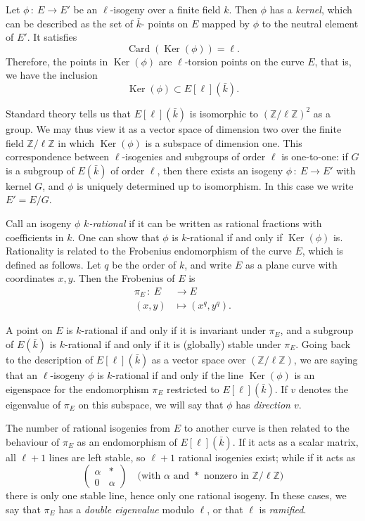 \documentclass{article}
\newcommand{\Z}{\mathbb{Z}}
\newcommand{\from}{\ensuremath{\,:\ }}
\DeclareMathOperator{\Ker}{Ker}
\DeclareMathOperator{\Card}{Card}
\begin{document}
Let $\phi\from E\to E'$ be an $\ell$-isogeny over a finite field $k$. Then 
$\phi$ has a \emph{kernel}, which can be described as the set of $\bar{k}$-
points on $E$ mapped by $\phi$ to the neutral element of $E'$. It satisfies
\[
\Card(\Ker(\phi)) = \ell.
\]
Therefore, the points in $\Ker(\phi)$ are $\ell$-torsion points on the curve 
$E$, that is, we have the inclusion
\[
\Ker(\phi) \subset E[\ell](\bar{k}).
\]

Standard theory tells us that $E[\ell](\bar{k})$ is isomorphic to $(\Z/\ell\Z)^2$
as a group. We may thus view it as a vector space of dimension two over the 
finite field $\Z/\ell\Z$ in which $\Ker(\phi)$ is a subspace of dimension one. 
This correspondence between $\ell$-isogenies and subgroups of order $\ell$ is 
one-to-one: if $G$ is a subgroup of $E(\bar{k})$ of order $\ell$, then there 
exists an isogeny $\phi\from E\to E'$ with kernel $G$, and $\phi$ is uniquely 
determined up to isomorphism. In this case we write $E' = E/G$.

Call an isogeny $\phi$ \emph{$k$-rational} if it can be written as rational 
fractions with coefficients in $k$. One can show that $\phi$ is $k$-rational if 
and only if $\Ker(\phi)$ is.
Rationality is related to the Frobenius endomorphism of the curve $E$, which is 
defined as follows. Let $q$ be the order of $k$, and write $E$ as a plane curve 
with coordinates $x, y$. Then the Frobenius of $E$ is
\[
\begin{aligned}
\pi_E \from E &\to E \\
 (x, y) &\mapsto (x^q, y^q).
\end{aligned}
\]

A point on $E$ is $k$-rational if and only if it is invariant under $\pi_E$, 
and a subgroup of $E(\bar{k})$ is $k$-rational if and only if it is (globally) 
stable under $\pi_E$. Going back to the description of $E[\ell](\bar{k})$ as a 
vector space over $(\Z/\ell\Z)$, we are saying that an $\ell$-isogeny $\phi$ is 
$k$-rational if and only if the line $\Ker(\phi)$ is an eigenspace for the 
endomorphism $\pi_E$ restricted to $E[\ell](\bar{k})$. If $v$ denotes the 
eigenvalue of $\pi_E$ on this subspace, we will say that $\phi$ has \emph{
direction $v$}.


The number of rational isogenies from $E$ to another curve is then related to 
the behaviour of $\pi_E$ as an endomorphism of $E[\ell](\bar{k})$. If it acts 
as a scalar matrix, all $\ell+1$ lines are left stable, so $\ell+1$ rational 
isogenies exist; while if it acts as
\[
\left(
\begin{matrix}
\alpha & * \\
0 & \alpha
\end{matrix}
\right)
\quad
\text{(with $\alpha$ and $*$ nonzero in $\Z/\ell\Z$)}
\]
there is only one stable line, hence only one rational isogeny. In these cases, 
we say that $\pi_E$ has a \emph{double eigenvalue} modulo $\ell$, or that $\ell$
 is \emph{ramified}.
\end{document}
